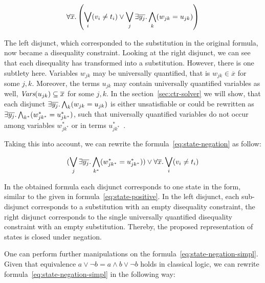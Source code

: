 \begin{equation}
  \label{eq:state-negation}  
  \forall\overline{x}\ldotp \left(
  \bigvee_{i}(v_i \neq t_i) \vee
  \bigvee_{j}\exists\overline{y_j}\ldotp
  \bigwedge_{k}(w_{jk} = u_{jk})
  \right)
\end{equation}

The left disjunct, which corresponded
to the substitution in the original formula, 
now became a disequality constraint. 
Looking at the right disjunct, 
we can see that each disequality 
has transformed into a substitution.
However, there is one subtlety here.
Variables $w_{jk}$ may be universally quantified,
that is $w_{jk} \in \overline{x}$ for some $j, k$.
Moreover, the terms $u_{jk}$ may contain universally quantified
variables as well, 
$\textit{Vars}({u_{jk}}) \subseteq \overline{x}$ for some $j, k$.
In the section~\ref{sec:ctr-solver} we will show,
that each disjunct  
$\exists\overline{y_j}\ldotp\bigwedge_{k}(w_{jk} = u_{jk})$ 
is either unsatisfiable or could be rewritten as 
$\exists\overline{y_j}\ldotp\bigwedge_{k^*}(w^*_{jk^*} = u^*_{jk^*})$,
such that universally quantified variables do not occur 
among variables $w^*_{jk^*}$ or in terms $u^*_{jk^*}$~\cite{liu1999constructive}. 

Taking this into account, we can rewrite the formula~\ref{eq:state-negation} as follow:

\begin{equation}
  \label{eq:state-negation-simpl}  
  (\bigvee_{j}\exists\overline{y_j}\ldotp
  \bigwedge_{k^*}(w^*_{jk^*} = u^*_{jk^*})) \vee
  \forall\overline{x}\ldotp
  \bigvee_{i}(v_i \neq t_i)
\end{equation}

In the obtained formula each disjunct corresponds to one state
in the form, similar to the given in formula~\ref{eq:state-positive}.
In the left disjunct, each sub-disjunct
corresponds to a substitution with an empty disequality constraint, 
the right disjunct corresponds to the 
single universally quantified disequality constraint 
with an empty substitution.
Thereby, the proposed representation of states
is closed under negation.

One can perform further manipulations on the formula~\ref{eq:state-negation-simpl}.
Given that equivalence $a \vee \neg b = a \wedge b \vee \neg b$ 
holds in classical logic, 
we can rewrite formula~\ref{eq:state-negation-simpl} in the following way:

